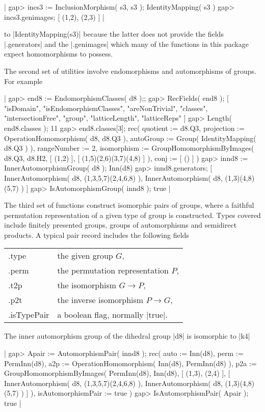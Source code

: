|    gap> incs3 := InclusionMorphism( s3, s3 );
    IdentityMapping( s3 )
    gap> incs3.genimages;
    [ (1,2), (2,3) ]  |

to |IdentityMapping(s3)| because   the  latter does   not  provide the
fields |.generators| and the |.genimages| which  many of the functions
in this package expect homomorphisms to possess.

The second set of utilities involve endomorphisms and automorphisms of
groups.  For example\:

|    gap> end8 := EndomorphismClasses( d8 );;
    gap> RecFields( end8 );
    [ "isDomain", "isEndomorphismClasses", "areNonTrivial", "classes",
      "intersectionFree", "group", "latticeLength", "latticeReps" ]
    gap> Length( end8.classes );
    11
    gap> end8.classes[3];
    rec(
      quotient := d8.Q3,
      projection := OperationHomomorphism( d8, d8.Q3 ),
      autoGroup := Group( IdentityMapping( d8.Q3 ) ),
      rangeNumber := 2,
      isomorphism := GroupHomomorphismByImages( d8.Q3, d8.H2, [ (1,2) ], 
        [ (1,5)(2,6)(3,7)(4,8) ] ),
      conj := [ () ] )
    gap> innd8 := InnerAutomorphismGroup( d8 );
    Inn(d8)
    gap> innd8.generators;
    [ InnerAutomorphism( d8, (1,3,5,7)(2,4,6,8) ), 
      InnerAutomorphism( d8, (1,3)(4,8)(5,7) ) ]
    gap> IsAutomorphismGroup( innd8 );
    true   |

The third set of functions construct isomorphic pairs of groups, where
a  faithful permutation  representation of a  given  type of group  is
constructed.  Types covered include  finitely presented groups, groups
of automorphisms   and  semidirect products.   A  typical pair  record
includes the following fields\:

\begin{tabular}{ll}
.type         &  the given group $G$,                \\
.perm         &  the permutation representation $P$, \\
.t2p          &  the isomorphism  $G \to P$,         \\
.p2t          &  the inverse isomorphism  $P \to G$, \\
.isTypePair   &  a boolean flag, normally |true|.
\end{tabular}

The inner automorphism group of the dihedral  group |d8| is isomorphic
to |k4|\:

|    gap> Apair := AutomorphismPair( innd8 );
    rec(
      auto := Inn(d8),
      perm := PermInn(d8),
      a2p := OperationHomomorphism( Inn(d8), PermInn(d8) ),
      p2a := GroupHomomorphismByImages( PermInn(d8), Inn(d8),
        [ (1,3), (2,4) ], 
        [ InnerAutomorphism( d8, (1,3,5,7)(2,4,6,8) ), 
          InnerAutomorphism( d8, (1,3)(4,8)(5,7) ) ] ),
      isAutomorphismPair := true )
    gap> IsAutomorphismPair( Apair );
    true  |

